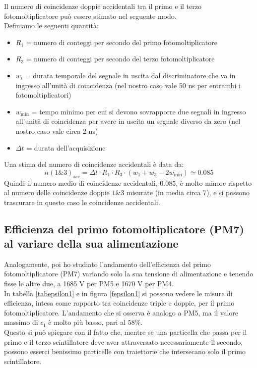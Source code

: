 \documentclass{article}
\begin{document}
Il numero di coincidenze doppie accidentali tra il primo e il terzo fotomoltiplicatore può essere stimato nel seguente modo. \\
Definiamo le seguenti quantità: 
\begin{itemize}
\item $R_1$ = numero di conteggi per secondo del primo fotomoltiplicatore
\item $R_3$ = numero di conteggi per secondo del terzo fotomoltiplicatore
\item $w_i$ = durata temporale del segnale in uscita dal discriminatore che va in ingresso all'unità di coincidenza (nel nostro caso vale 50 ns per entrambi i fotomoltiplicatori)
\item $w_{\text{min}}$ = tempo minimo per cui si devono sovrapporre due segnali in ingresso all'unità di coincidenza per avere in uscita un segnale diverso da zero (nel nostro caso vale circa 2 ns)
\item $\Delta t$ = durata dell'acquisizione
\end{itemize}
Una stima del numero di coincidenze accidentali è data da: 
\begin{equation}
n(1\&3)_{\text{acc}} = \Delta t \cdot R_1 \cdot R_3 \cdot (w_1+w_3-2w_{\text{min}}) \simeq 0.085
\end{equation}
Quindi il numero medio di coincidenze accidentali, 0.085, è molto minore rispetto al numero delle coincidenze doppie $1\&3$ misurate (in media circa 7), e si possono trascurare in questo caso le coincidenze accidentali. 
\newpage
\subsection{Efficienza del primo fotomoltiplicatore (PM7) al variare della sua alimentazione}
Analogamente, poi ho studiato l'andamento dell'efficienza del primo fotomoltiplicatore (PM7) variando solo la sua tensione di alimentazione e tenendo fisse le altre due, a 1685 V per PM5 e 1670 V per PM4.
\\
In tabella \ref{tabepsilon1} e in figura  \ref{fepsilon1}  si possono vedere le misure di efficienza, intesa come rapporto tra coincidenze triple e doppie, per il primo fotomoltiplicatore. L'andamento che si osserva è analogo a PM5, ma il valore massimo di $\epsilon_1$ è molto più basso, pari al $58\%$.\\
Questo si può spiegare con il fatto che, mentre se una particella che passa per il primo e il terzo scintillatore deve aver attraversato necessariamente il secondo, possono esserci benissimo particelle con traiettorie che intersecano solo il primo scintillatore. 
\end{document}
